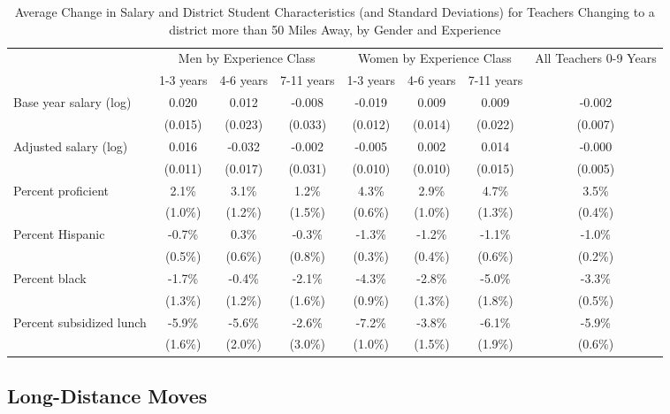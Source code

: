 \documentclass[12pt,]{article}
\begin{document}
\begin{sidewaystable}[htbp]
\centering
\begin{tabular}{lccccccc}
  \hline
 & \multicolumn{3}{c}{Men by Experience Class} & \multicolumn{3}{c}{Women by Experience Class} & \multirow{2}{*}{\parbox{0.1\linewidth}{All Teachers 0-9 Years}}\\ \cline{2-4} \cline{5-7}
 & 1-3 years & 4-6 years & 7-11 years & 1-3 years & 4-6 years & 7-11 years &  \\ 
  \hline
Base year salary (log) & 0.020 & 0.012 & -0.008 & -0.019 & 0.009 & 0.009 & -0.002 \\ 
   & (0.015) & (0.023) & (0.033) & (0.012) & (0.014) & (0.022) & (0.007) \\ 
  Adjusted salary (log) & 0.016 & -0.032 & -0.002 & -0.005 & 0.002 & 0.014 & -0.000 \\ 
   & (0.011) & (0.017) & (0.031) & (0.010) & (0.010) & (0.015) & (0.005) \\ 
  Percent proficient & 2.1\% & 3.1\% & 1.2\% & 4.3\% & 2.9\% & 4.7\% & 3.5\% \\ 
   & (1.0\%) & (1.2\%) & (1.5\%) & (0.6\%) & (1.0\%) & (1.3\%) & (0.4\%) \\ 
  Percent Hispanic & -0.7\% & 0.3\% & -0.3\% & -1.3\% & -1.2\% & -1.1\% & -1.0\% \\ 
   & (0.5\%) & (0.6\%) & (0.8\%) & (0.3\%) & (0.4\%) & (0.6\%) & (0.2\%) \\ 
  Percent black & -1.7\% & -0.4\% & -2.1\% & -4.3\% & -2.8\% & -5.0\% & -3.3\% \\ 
   & (1.3\%) & (1.2\%) & (1.6\%) & (0.9\%) & (1.3\%) & (1.8\%) & (0.5\%) \\ 
  Percent subsidized lunch & -5.9\% & -5.6\% & -2.6\% & -7.2\% & -3.8\% & -6.1\% & -5.9\% \\ 
   & (1.6\%) & (2.0\%) & (3.0\%) & (1.0\%) & (1.5\%) & (1.9\%) & (0.6\%) \\ 
   \hline
\end{tabular}
\caption{Average Change in Salary and District Student Characteristics (and Standard Deviations) for Teachers Changing to a district more than 50 Miles Away, by Gender and Experience} 
\label{tbl:change_far_by_ge}
\end{sidewaystable}

\subsection{Long-Distance Moves}\label{long-distance-moves}
\end{document}

